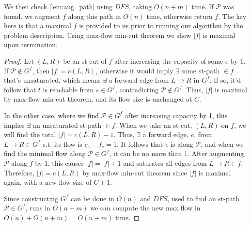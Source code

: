\documentclass{article}
\begin{document}
	We then check \ref{lem:aug_path} using $DFS$, taking $O(n+m)$ time. If $\mathcal{P}$ was found, we augment $f$ along this path in $O(n)$ time, otherwise return $f$. The key here is that a maximal $f$ is provided to us prior to running our algorithm by the problem description. Using max-flow min-cut theorem we show $|f|$ is maximal upon termination.

\begin{proof}
	Let $(L,R)$ be an st-cut of $f$ after increasing the capacity of some $e$ by 1. If $\mathcal{P} \notin G^f$, then $|f| = c(L,R)$, otherwise it would imply $\exists$ some st-path $\in f$ that's unsaturated, which means $\exists$ a forward edge from $L \to R$ in $G^f$. If so, it'd follow that $t$ is reachable from $s \in G^f$, contradicting  $\mathcal{P} \notin G^f$. Thus, $|f|$ is maximal by max-flow min-cut theorem, and its flow size is unchanged at $C$.
	
	In the other case, where we find $\mathcal{P} \in G^f$ after increasing capacity by 1, this implies $\exists$ an unsaturated st-path $\in f$. When we take an st-cut, $(L,R)$ on $f$, we will find the total $|f| = c(L,R) -1$. Thus, $\exists$ a forward edge, $e$, from $L \to R \in G^f$ s.t. its flow is $c_e - f_e = 1$. It follows that $e$ is along $\mathcal{P}$, and when we find the minimal flow along $\mathcal{P} \in G^f$, it can be no more than 1. After augmenting $\mathcal{P}$ along $f$ by 1, this causes $|f| = |f|+1$ and saturates all edges from $L \to R \in f$. Therefore, $|f| = c(L,R)$ by max-flow min-cut theorem since $|f|$ is maximal again, with a new flow size of $C+1$.
	
	Since constructing $G^f$ can be done in $O(n)$ and $DFS$, used to find an st-path $\mathcal{P} \in G^f$, runs in $O(n+m)$ we can compute the new max flow in $O(n) + O(n+m) = O(n+m)$ time.
\end{proof}
 
\end{document}
